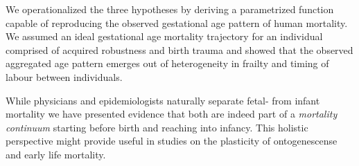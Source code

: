 \documentclass[12pt, parskip=half]{scrartcl}
\begin{document}
We operationalized the three hypotheses by deriving a parametrized function capable of reproducing the observed gestational age pattern of human mortality. We assumed an ideal gestational age mortality trajectory for an individual comprised of acquired robustness and birth trauma and showed that the observed aggregated age pattern emerges out of heterogeneity in frailty and timing of labour between individuals.

While physicians and epidemiologists naturally separate fetal- from infant mortality we have presented evidence that both are indeed part of a \emph{mortality continuum} starting before birth and reaching into infancy. This holistic perspective might provide useful in studies on the plasticity of ontogenescense and early life mortality.

\clearpage


\sloppy
\printbibliography




\end{document}
